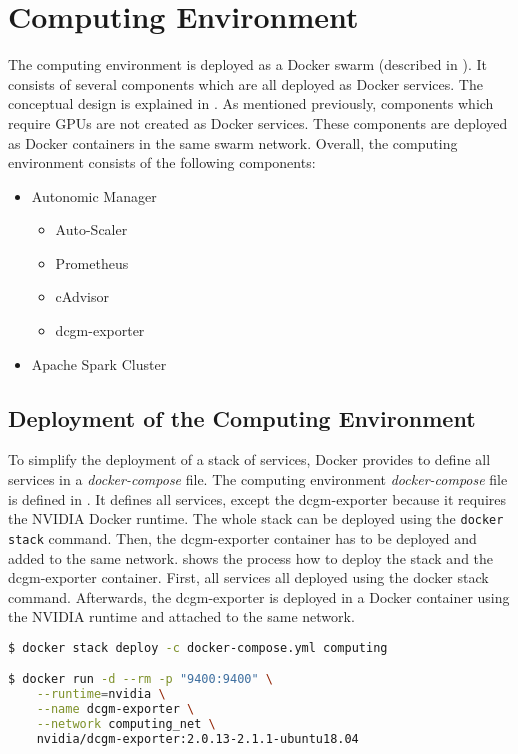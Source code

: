 \section{Computing Environment}
The computing environment is deployed as a Docker swarm (described in ). It consists of several components which are all deployed as Docker services. The conceptual design is explained in .
As mentioned previously, components which require GPUs are not created as Docker services. These components are deployed as Docker containers in the same swarm network.
Overall, the computing environment consists of the following components:
\begin{itemize}
\item Autonomic Manager
\begin{itemize}
\item Auto-Scaler
\item Prometheus
\item cAdvisor
\item dcgm-exporter
\end{itemize}

\item Apache Spark Cluster
\end{itemize}


\subsection{Deployment of the Computing Environment}
%
To simplify the deployment of a stack of services, Docker provides to define all services in a \textit{docker-compose} file.
% 
The computing environment \textit{docker-compose} file is defined in .
%
It defines all services, except the dcgm-exporter because it requires the NVIDIA Docker runtime.
%
The whole stack can be deployed using the \texttt{docker stack} command. Then, the dcgm-exporter container has to be deployed and added to the same network.
%
 shows the process how to deploy the stack and the dcgm-exporter container. First, all services all deployed using the docker stack command. Afterwards, the dcgm-exporter is deployed in a Docker container using the NVIDIA runtime and attached to the same network.
\begin{lstlisting}[label=lst:06_env_depl_docker-stack, caption=Auto-Scaler start command, language=sh, numbers=none]
$ docker stack deploy -c docker-compose.yml computing

$ docker run -d --rm -p "9400:9400" \
    --runtime=nvidia \
    --name dcgm-exporter \
    --network computing_net \
    nvidia/dcgm-exporter:2.0.13-2.1.1-ubuntu18.04
\end{lstlisting}


